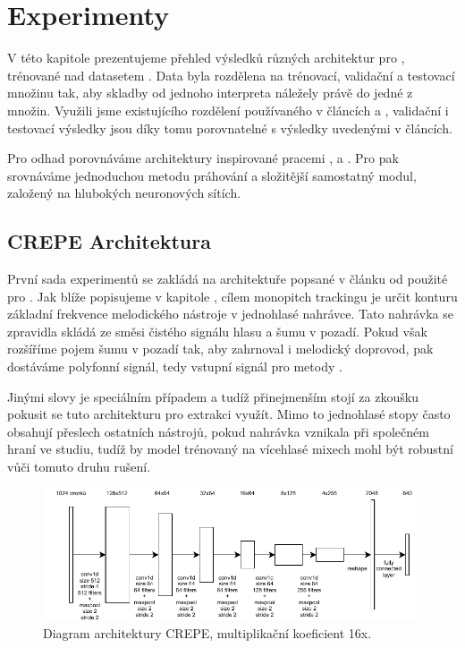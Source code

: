\chapter{Experimenty}

V této kapitole prezentujeme přehled výsledků různých architektur pro , trénované nad datasetem . Data byla rozdělena na trénovací, validační a testovací množinu tak, aby skladby od jednoho interpreta náležely právě do jedné z množin. Využili jsme existujícího rozdělení používaného v článcích \cite{Bittner2017} a \cite{DBasaranSEssid2018}, validační i testovací výsledky jsou díky tomu porovnatelné s výsledky uvedenými v článcích.

Pro odhad  porovnáváme architektury inspirované pracemi \cite{Kim2018}, \cite{Oord2016} a \cite{Bittner2017}. Pro  pak srovnáváme jednoduchou metodu práhování a složitější samostatný modul, založený na hlubokých neuronových sítích.

\section{CREPE Architektura}

První sada experimentů se zakládá na architektuře popsané v článku od \cite{Kim2018} použité pro . Jak blíže popisujeme v kapitole , cílem monopitch trackingu je určit konturu základní frekvence melodického nástroje v jednohlasé nahrávce. Tato nahrávka se zpravidla skládá ze směsi čistého signálu hlasu a šumu v pozadí. Pokud však rozšíříme pojem šumu v pozadí tak, aby zahrnoval i melodický doprovod, pak dostáváme polyfonní signál, tedy vstupní signál pro metody .

Jinými slovy je  speciálním případem  a tudíž přinejmenším stojí za zkoušku pokusit se tuto architekturu pro extrakci využít. Mimo to jednohlasé stopy často obsahují přeslech ostatních nástrojů, pokud nahrávka vznikala při společném hraní ve studiu, tudíž by model trénovaný na vícehlasé mixech mohl být robustní vůči tomuto druhu rušení. 

\begin{figure}[h]\centering
\includegraphics{../img/crepe_arch}
\caption{Diagram architektury CREPE, multiplikační koeficient 16x.}
\label{obr:wavenet_dilated}
\end{figure}


